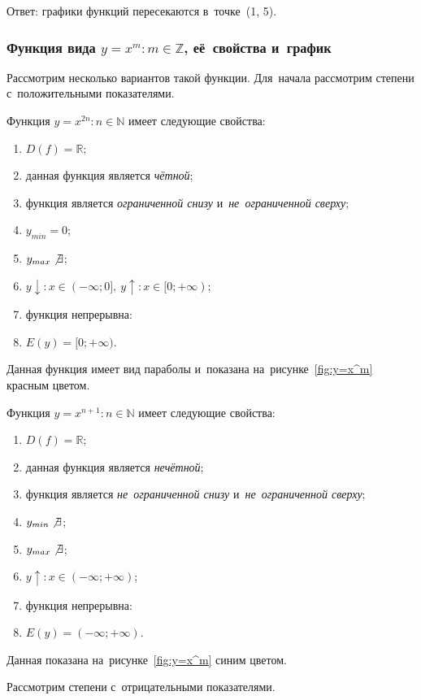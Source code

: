 \documentclass[]{scrartcl}
\begin{document}
{{\begin{Thexmpl}
	Ответ: графики функций пересекаются в~точке~(1, 5).
\end{Thexmpl}

\subsubsection{Функция вида ${\textstyle y=x^m:m \in \mathbb{Z}}$, её~свойства и~график}
Рассмотрим несколько вариантов такой функции. Для~начала рассмотрим степени с~положительными показателями.

Функция ${\textstyle y=x^{2n}: n \in \mathbb{N}}$ имеет следующие свойства:
\begin{enumerate}
	\item ${\textstyle D(f)=\mathbb{R}}$;
	\item данная функция является \emph{чётной};
	\item функция является \emph{ограниченной снизу} и~\emph{не~ограниченной сверху};
	\item ${\textstyle y_{min}=0}$;
	\item ${\textstyle y_{max}\not \exists}$;
	\item ${\textstyle y\downarrow:x\in (-\infty;0],\ y\uparrow:x\in [0;+\infty)}$;
	\item функция непрерывна:
	\item ${\textstyle E(y)=[0;+\infty)}$.
\end{enumerate}
Данная функция имеет вид параболы и~показана на~рисунке~\ref{fig:y=x^m} красным цветом.

Функция ${\textstyle y=x^{n+1}: n \in \mathbb{N}}$ имеет следующие свойства:
\begin{enumerate}
	\item ${\textstyle D(f)=\mathbb{R}}$;
	\item данная функция является \emph{нечётной};
	\item функция является \emph{не~ограниченной снизу} и~\emph{не~ограниченной сверху};
	\item ${\textstyle y_{min}\not \exists}$;
	\item ${\textstyle y_{max}\not \exists}$;
	\item ${\textstyle y\uparrow:x\in (-\infty;+\infty)}$;
	\item функция непрерывна:
	\item ${\textstyle E(y)=(-\infty;+\infty)}$.
\end{enumerate}
Данная показана на~рисунке~\ref{fig:y=x^m} синим цветом.

Рассмотрим степени с~отрицательными показателями.

}}
\end{document}

